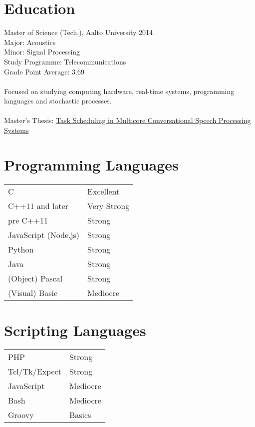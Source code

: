 \documentclass[12pt]{article}
\begin{document}
\section*{Education}

\large{Master of Science (Tech.), Aalto University 2014}\\
\normalsize{
Major: Acoustics\\
Minor: Signal Processing\\
Study Programme: Telecommunications\\
Grade Point Average: 3.69\\
\\
Focused on studying computing hardware, real-time systems, programming 
languages and stochastic processes.\\
\\
Master's Thesis:
\href{https://aaltodoc.aalto.fi/bitstream/handle/123456789/14402/master_
Lindroos_Michele_2014.pdf?sequence=1}
{Task Scheduling in Multicore Conversational Speech Processing Systems}
}


\section*{Programming Languages}

\begin{tabular}{ll}
C & Excellent\\
C++11 and later & Very Strong\\
pre C++11 & Strong\\
JavaScript (Node.js) & Strong\\
Python & Strong\\
Java & Strong\\
(Object) Pascal & Strong\\
(Visual) Basic & Mediocre
\end{tabular}


\section*{Scripting Languages}

\begin{tabular}{ll}
PHP & Strong\\
Tcl/Tk/Expect & Strong\\
JavaScript & Mediocre\\
Bash & Mediocre\\
Groovy & Basics\\
\end{tabular}
\end{document}
